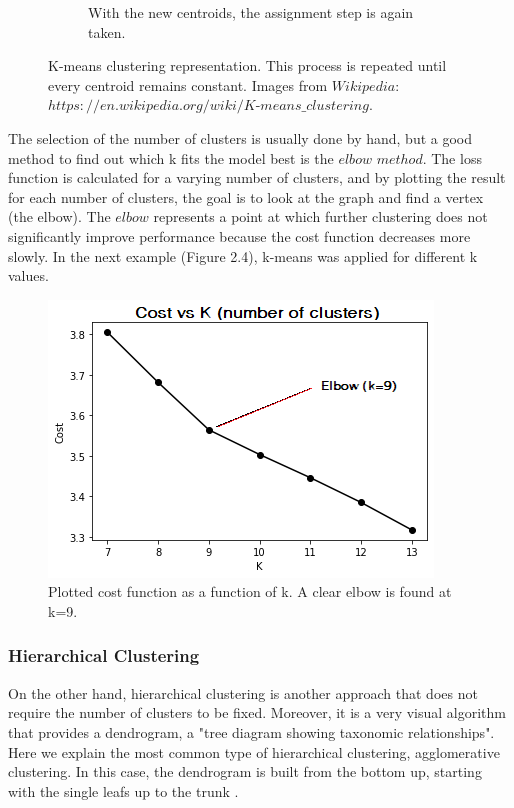 \begin{figure}[H]
\begin{subfigure}[H]{0.2\textwidth}
        \vspace{-15pt}
        \caption{With the new centroids, the assignment step is again taken.}
    \end{subfigure}
    \caption{K-means clustering representation. This process is repeated until every centroid remains constant. Images from $Wikipedia$: $https://en.wikipedia.org/wiki/K$-$means\_clustering$. \\}
\end{figure}
The selection of the number of clusters is usually done by hand, but a good method to find out which k fits the model best is the $elbow$ $method$. 
The loss function is calculated for a varying number of clusters, and by plotting the result for each number of clusters, the goal is to look at the graph and find a vertex (the elbow). The $elbow$ represents a point at which further clustering does not significantly improve performance because the cost function decreases more slowly. In the next example (Figure 2.4), k-means was applied for different k values.
\begin{figure}[h!]
    \centering
    \includegraphics[scale=0.7]{Images/Methods/K-means/Fingerprints_elbow.png}
    \caption{Plotted cost function as a function of k. A clear elbow is found at k=9.}
\end{figure}


\subsubsection{Hierarchical Clustering}
On the other hand, hierarchical clustering is another approach that does not require the number of clusters to be fixed. Moreover, it is a very visual algorithm that provides a dendrogram, a "tree diagram showing taxonomic relationships". Here we explain the most common type of hierarchical clustering, agglomerative clustering. In this case, the dendrogram is built from the bottom up, starting with the single leafs up to the trunk \cite{James2013}.\\
 
